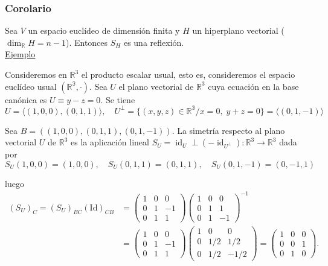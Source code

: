 \documentclass[12pt, a4paper, ones, notitlepage, openany,titlepage]{article}
\begin{document}
\subsubsection{Corolario}
Sea $V$ un espacio euclídeo de dimensión finita y $H$ un hiperplano vectorial ($\operatorname{dim}_\mathbb{R}H = n - 1$). Entonces $S_H$ es una reflexión.\\

\noindent\underline{Ejemplo}

Consideremos en $\mathbb{R}^{3}$ el producto escalar usual, esto es, consideremos el espacio euclídeo usual $(\mathbb{R^3}, \cdot)$. Sea $U$ el plano vectorial de $\mathbb{R}^{3}$ cuya ecuación en la base canónica es $U\equiv y-z=0$. Se tiene
$$
U=\langle(1,0,0),(0,1,1)\rangle, \quad U^{\perp}=\{(x, y, z) \in \mathbb{R^3} / x = 0, \; y + z = 0\}=\langle(0,1,-1)\rangle
$$

Sea $B=((1,0,0),(0,1,1),(0,1,-1))$. La simetría respecto al plano vectorial $U$ de $\mathbb{R}^{3}$ es la aplicación lineal $S_{U}=\operatorname{id}_{U} \perp\left(-\operatorname{id}_{U^{\perp}}\right): \mathbb{R}^{3} \rightarrow \mathbb{R}^{3}$ dada por
$$
S_{U}(1,0,0)=(1,0,0), \quad S_{U}(0,1,1)=(0,1,1), \quad S_{U}(0,1,-1)=(0,-1,1)
$$

\noindent luego
$$
\begin{aligned}
	\left(S_{U}\right)_{C}=\left(S_{U}\right)_{B C} \operatorname{(Id)}_{C B} & =\left(\begin{array}{rrr}
		1 & 0 & 0 \\
		0 & 1 & -1 \\
		0 & 1 & 1
	\end{array}\right)\left(\begin{array}{rrr}
		1 & 0 & 0 \\
		0 & 1 & 1 \\
		0 & 1 & -1
	\end{array}\right)^{-1} \\
	& =\left(\begin{array}{rrr}
		1 & 0 & 0 \\
		0 & 1 & -1 \\
		0 & 1 & 1
	\end{array}\right)\left(\begin{array}{rrr}
		1 & 0 & 0 \\
		0 & 1 / 2 & 1 / 2 \\
		0 & 1 / 2 & -1 / 2
	\end{array}\right)=\left(\begin{array}{lll}
		1 & 0 & 0 \\
		0 & 0 & 1 \\
		0 & 1 & 0
	\end{array}\right) .
\end{aligned}
$$
\end{document}
